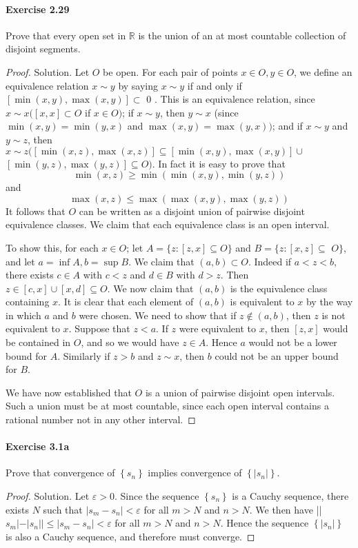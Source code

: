 \documentclass{article}
\theoremstyle{definition}
\begin{document}
\paragraph{Exercise 2.29} Prove that every open set in $\mathbb{R}$ is the union of an at most countable collection of disjoint segments.
\begin{proof}
    Solution. Let $O$ be open. For each pair of points $x \in O, y \in O$, we define an equivalence relation $x \sim y$ by saying $x \sim y$ if and only if $[\min (x, y), \max (x, y)] \subset$ 0 . This is an equivalence relation, since $x \sim x([x, x] \subset O$ if $x \in O)$; if $x \sim y$, then $y \sim x$ (since $\min (x, y)=\min (y, x)$ and $\max (x, y)=\max (y, x))$; and if $x \sim y$ and $y \sim z$, then $x \sim z([\min (x, z), \max (x, z)] \subseteq[\min (x, y), \max (x, y)] \cup$ $[\min (y, z), \max (y, z)] \subseteq O)$. In fact it is easy to prove that
$$
\min (x, z) \geq \min (\min (x, y), \min (y, z))
$$
and
$$
\max (x, z) \leq \max (\max (x, y), \max (y, z))
$$
It follows that $O$ can be written as a disjoint union of pairwise disjoint equivalence classes. We claim that each equivalence class is an open interval.

To show this, for each $x \in O$; let $A=\{z:[z, x] \subseteq O\}$ and $B=\{z:[x, z] \subseteq$ $O\}$, and let $a=\inf A, b=\sup B$. We claim that $(a, b) \subset O$. Indeed if $a<z<b$, there exists $c \in A$ with $c<z$ and $d \in B$ with $d>z$. Then $z \in[c, x] \cup[x, d] \subseteq O$. We now claim that $(a, b)$ is the equivalence class containing $x$. It is clear that each element of $(a, b)$ is equivalent to $x$ by the way in which $a$ and $b$ were chosen. We need to show that if $z \notin(a, b)$, then $z$ is not equivalent to $x$. Suppose that $z<a$. If $z$ were equivalent to $x$, then $[z, x]$ would be contained in $O$, and so we would have $z \in A$. Hence $a$ would not be a lower bound for $A$. Similarly if $z>b$ and $z \sim x$, then $b$ could not be an upper bound for $B$.

We have now established that $O$ is a union of pairwise disjoint open intervals. Such a union must be at most countable, since each open interval contains a rational number not in any other interval.
\end{proof}


\paragraph{Exercise 3.1a} Prove that convergence of $\left\{s_{n}\right\}$ implies convergence of $\left\{\left|s_{n}\right|\right\}$.
\begin{proof}
    Solution. Let $\varepsilon>0$. Since the sequence $\left\{s_n\right\}$ is a Cauchy sequence, there exists $N$ such that $\left|s_m-s_n\right|<\varepsilon$ for all $m>N$ and $n>N$. We then have ||$s_m|-| s_n|| \leq\left|s_m-s_n\right|<\varepsilon$ for all $m>N$ and $n>N$. Hence the sequence $\left\{\left|s_n\right|\right\}$ is also a Cauchy sequence, and therefore must converge.
\end{proof}
\end{document}
